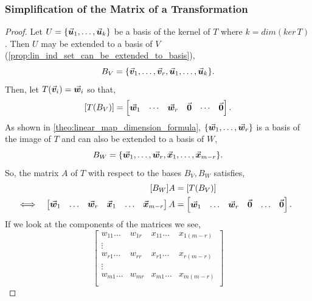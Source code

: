 \documentclass[MathsNotesBase.tex]{subfiles}
\begin{document}
{		\subsubsection{Simplification of the Matrix of a Transformation}
		\medskip
		\begin{proof}
			Let ${ U = \{\vec{\bm{u}}_1,\dots,\vec{\bm{u}}_k\} }$ be a basis of the kernel of $T$ where ${ k = dim(ker\,T) }$. Then $U$ may be extended to a basis of $V$ (\autoref{prop:lin_ind_set_can_be_extended_to_basis}),
			\[ B_V = \{\vec{\bm{v}}_1,\dots,\vec{\bm{v}}_r,\vec{\bm{u}}_1,\dots,\vec{\bm{u}}_k\}. \]
			Then, let ${ T(\vec{\bm{v}}_i) = \vec{\bm{w}}_i }$ so that,
			\[ [T(B_V)] = \begin{bmatrix}
						\vec{\bm{w}}_1 & \cdots & \vec{\bm{w}}_r & \vec{\bm{0}} & \cdots & \vec{\bm{0}}
						\end{bmatrix}. 
			\]
			As shown in \autoref{theo:linear_map_dimension_formula}, ${ \{ \vec{\bm{w}}_1,\dots,\vec{\bm{w}}_r \} }$ is a basis of the image of $T$ and can also be extended to a basis of $W$,
			\[ B_W = \{ \vec{\bm{w}}_1,\dots,\vec{\bm{w}}_r, \vec{\bm{x}}_1,\dots, \vec{\bm{x}}_{m-r} \}. \]
			So, the matrix $A$ of $T$ with respect to the bases ${ B_V,B_W }$ satisfies,
			\begin{align*}
			&& [B_W]A &= [T(B_V)] \\
			&\iff & \begin{bmatrix}\vec{\bm{w}}_1 & \dots & \vec{\bm{w}}_r & \vec{\bm{x}}_1 & \dots & \vec{\bm{x}}_{m-r}\end{bmatrix}A &= 
					\begin{bmatrix}\vec{\bm{w}}_1 & \dots & \vec{\bm{w}}_r & \vec{\bm{0}} & \dots & \vec{\bm{0}}\end{bmatrix}. &\text{\scriptsize{}}
			\end{align*}
			If we look at the components of the matrices we see,
			\[  
				\begin{bmatrix}
				w_{11} \dots & w_{1r} & x_{11} \dots & x_{1(m-r)} \\
				\vdots &  &  &  \\
				w_{r1} \dots & w_{rr} & x_{r1} \dots & x_{r(m-r)} \\
				\vdots &  &  &  \\
				w_{m1} \dots & w_{mr} & x_{m1} \dots & x_{m(m-r)} \\

\end{bmatrix}\]
\end{proof}}
\end{document}

